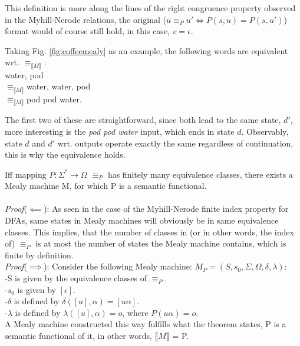 This definition is more along the lines of the right congruence property observed in the Myhill-Nerode relations, the original ($u \equiv_P u' \iff P(s, u) = P(s, u')$) format would of course still hold, in this case, $v = \epsilon$.

\begin{example}
	Taking Fig. \ref{fig:coffeemealy} as an example, the following words are equivalent wrt. $\equiv_{\llbracket M\rrbracket}$:\\
	\null\qquad\qquad\qquad\qquad\space water, pod\\
	\null\qquad\qquad$\equiv_{\llbracket M\rrbracket}$\qquad water, water, pod\\
	\null\qquad\qquad$\equiv_{\llbracket M\rrbracket}$\qquad pod pod water.
	
	The first two of these are straightforward, since both lead to the same state, $d'$, more interesting is the \textit{pod pod water} input, which ends in state $d$. Observably, state $d$ and $d'$ wrt. outputs operate exactly the same regardless of continuation, this is why the equivalence holds.
\end{example}

\begin{theorem}
	Iff mapping $P: \Sigma^*\to\Omega$ $\equiv_P$ has finitely many equivalence classes, there exists a Mealy machine M, for which P is a semantic functional.
	\\\\
	\textit{Proof}($\impliedby$): As seen in the case of the Myhill-Nerode finite index property for DFAs, same states in Mealy machines will obviously be in same equivalence classes. This implies, that the number of classes in (or in other words, the index of) $\equiv_P$ is at most the number of states the Mealy machine contains, which is finite by definition.
	\\
	\textit{Proof}($\implies$): Consider the following Mealy machine: $M_P=(S,s_{0},\Sigma,\Omega,\delta,\lambda)$:\\
	\null\qquad -S is given by the equivalence classes of $\equiv_P$.\\
	\null\qquad -$s_0$ is given by $[\epsilon]$.\\
	\null\qquad -$\delta$ is defined by $\delta([u], \alpha) = [u\alpha]$.\\
	\null\qquad -$\lambda$ is defined by $\lambda([u], \alpha) = o$, where $P(u\alpha) = o$.\\
	A Mealy machine constructed this way fulfills what the theorem states, P is a semantic functional of it, in other words, $\llbracket M\rrbracket$ = P.
\end{theorem}

